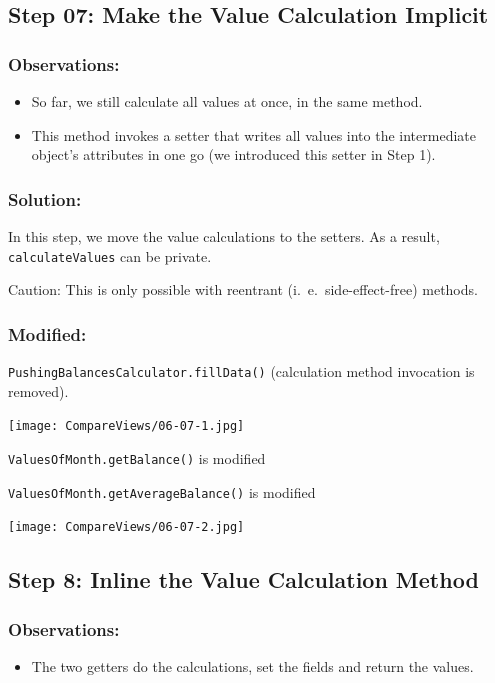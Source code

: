 \documentclass[a4paper,fleqn,titlepage,11pt]{article}
\begin{document}
\subsection*{Step 07: Make the Value Calculation Implicit}

\subsubsection*{Observations:}
\begin{itemize}
\item So far, we still calculate all values at once, in the same method. 
\item This method invokes a setter that writes all values into the intermediate object's attributes in one go (we introduced this setter in Step 1).
\end{itemize}

\subsubsection*{Solution:}
In this step, we move the value calculations to the setters. As a result, \texttt{calculateValues} can be private.

Caution: This is only possible with reentrant (i.~e.~side-effect-free) methods.

\subsubsection*{Modified:}

\texttt{PushingBalancesCalculator.fillData()} (calculation method invocation is removed).

\texttt{[image: CompareViews/06-07-1.jpg]}

\texttt{ValuesOfMonth.getBalance()} is modified

\texttt{ValuesOfMonth.getAverageBalance()} is modified


\texttt{[image: CompareViews/06-07-2.jpg]}



\subsection*{Step 8: Inline the Value Calculation Method}

\subsubsection*{Observations:}
\begin{itemize}
\item The two getters do the calculations, set the fields and return the values. 
\end{itemize}
\end{document}

